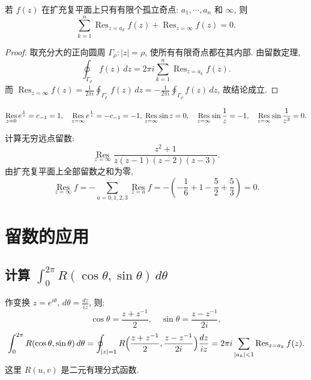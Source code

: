 \documentclass[theorem=false,mathfont=none,openany,sub3section]{easybook}
\begin{document}
\begin{theorem}
  若 $f(z)$ 在扩充复平面上只有有限个孤立奇点: $a_{1},\cdots,a_{n}$ 和 $\infty$, 则
  \[
  \sum_{k=1}^{n}\operatorname{Res}_{z=a_{k}}f(z)+\operatorname{Res}_{z=\infty}f(z)=0.
  \]
\end{theorem}

\begin{proof}
  取充分大的正向圆周 $\Gamma_{\rho}:|z|=\rho$, 使所有有限奇点都在其内部. 由留数定理,
  \[
  \oint_{\Gamma_{\rho}}f(z)\,dz=2\pi i\sum_{k=1}^{n}\operatorname{Res}_{z=a_{k}}f(z).
  \]
  而 $\operatorname{Res}_{z=\infty}f(z)=\frac{1}{2\pi i}\oint_{\Gamma_{\rho}^{-}}f(z)\,dz
  =-\frac{1}{2\pi i}\oint_{\Gamma_{\rho}}f(z)\,dz$, 故结论成立.
\end{proof}

\begin{example}
  \[
  \operatorname*{Res}_{z=0}e^{\frac{1}{z}}=c_{-1}=1,\quad
  \operatorname*{Res}_{z=\infty}e^{\frac{1}{z}}=-c_{-1}=-1,\\
  \operatorname*{Res}_{z=\infty}\sin z=0,\quad
  \operatorname*{Res}_{z=\infty}\sin\frac{1}{z}=-1,\quad
  \operatorname*{Res}_{z=\infty}\sin\frac{1}{z^{3}}=0.
  \]
\end{example}

\begin{example}
  计算无穷远点留数:
  \[
  \operatorname*{Res}_{z=\infty}
  \frac{z^{2}+1}{z(z-1)(z-2)(z-3)}.
  \]
  由扩充复平面上全部留数之和为零,
  \[
  \operatorname*{Res}_{z=\infty}f
  =-\sum_{a=0,1,2,3}\operatorname*{Res}_{z=a}f
  =-\left(-\frac16+1-\frac52+\frac53\right)=0.
  \]
\end{example}

\newpage

\section{留数的应用}

\subsection{\texorpdfstring{计算 $\int_{0}^{2\pi}R(\cos\theta,\sin\theta)\,d\theta$}{计算三角有理函数的周期积分}}

作变换 $z=e^{i\theta}$, $d\theta=\frac{dz}{iz}$, 则:
\[
\cos\theta=\frac{z+z^{-1}}{2},\quad
\sin\theta=\frac{z-z^{-1}}{2i},
\]
\[
\int_{0}^{2\pi}R(\cos\theta,\sin\theta)\,d\theta
=\oint_{|z|=1}R\Bigl(\frac{z+z^{-1}}{2},\frac{z-z^{-1}}{2i}\Bigr)\frac{dz}{iz}
=2\pi i\sum_{|a_{k}|<1}\operatorname{Res}_{z=a_{k}}f(z).
\]
这里 $R(u,v)$ 是二元有理分式函数.
\end{document}
